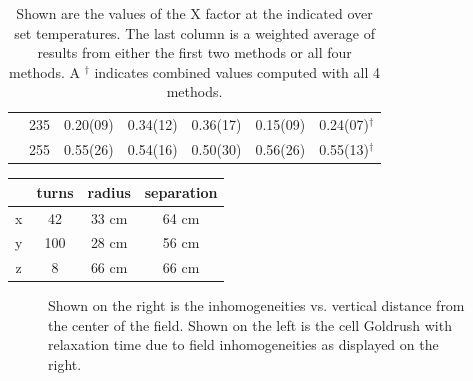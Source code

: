 \documentclass[pdftex,letterpaper,12pt]{report}
\begin{document}
\begin{table}
\begin{center}
\begin{tabular}{|c|c|cccc|c|}
			& 235 & 0.20(09) & 0.34(12) & 0.36(17) & 0.15(09) & 0.24(07)$^\dagger$\\
			& 255 & 0.55(26) & 0.54(16) & 0.50(30) & 0.56(26) & 0.55(13)$^\dagger$\\
			\hline
		\end{tabular}
		\caption
		{Shown are the values of the X factor at the indicated over set temperatures. The last column is a weighted average of results from either the first two methods or all four methods. A $^\dagger$ indicates combined values computed with all 4 methods.}
		\label{table:Xtable}
	\end{center}
\end{table}

\begin{center}
	\begin{tabular}{ | c | c| c| c | }
		\hline
		& turns & radius & separation \\ \hline
		x & 42 & 33 cm & 64 cm \\ \hline 
		y & 100 & 28 cm & 56 cm \\ \hline
		z & 8 & 66 cm & 66 cm \\
		\hline
	\end{tabular}
\end{center}

\begin{figure}[t!]
	\centering
	\caption{{Shown on the right is the inhomogeneities vs. vertical distance from the center of the field. Shown on the left is the cell Goldrush with relaxation time due to field inhomogeneities as displayed on the right.}}
	\label{goldrush_inhomogeneities}
\end{figure}
\end{document}
